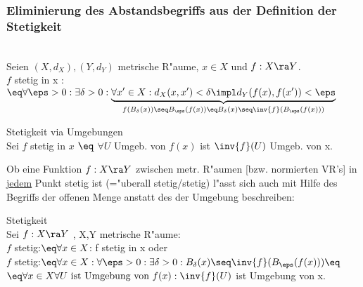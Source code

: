 \subsubsection{Eliminierung des Abstandsbegriffs aus der Definition der Stetigkeit}
\begin{definition}\label{1.8}\\
Seien $(X,d_X),(Y,d_Y)$ metrische R"aume, $x\in X$ und $f:X\ra Y$.\\
$f$ stetig in x :$\eq\forall\eps >0:\exists \delta >0:
\underbrace{\forall x'\in X: d_X(x,x')< \delta\impl d_Y(f(x),f(x')) < \eps }
_{f(B_\delta(x))\seq B_\eps(f(x))\eq B_\delta(x)\seq \inv{f}(B_\eps(f(x)))}$
\end{definition}

\begin{prop}\label{1.9}{Stetigkeit via Umgebungen}\\
Sei $f$ stetig in $x$ $\eq$ $\forall U$ Umgeb. von $f(x)$ ist $\inv{f}(U)$ Umgeb. von x.
\end{prop}
Ob eine Funktion $f:X\ra Y$ zwischen metr. R"aumen [bzw. normierten VR's] in \ul{jedem} Punkt stetig ist (="uberall stetig/stetig) l"asst sich auch mit Hilfe des Begriffs der offenen Menge anstatt des der Umgebung beschreiben:
\begin{definition}\label{1.10}{Stetigkeit}\\
Sei $f:X\ra Y$ , X,Y metrische R"aume:\\
$f$ stetig:$\eq \forall x\in X$: f stetig in x {\small oder}\\
$f$ stetig:$\eq \forall x\in X: \forall \eps >0: \exists\delta >0: B_\delta (x)\seq \inv{f}(B_\eps(f(x)))\eq$\\
$\eq\forall x\in X \forall U \mbox{ ist Umgebung von }f(x):\inv{f}(U)$ ist Umgebung von x.
\end{definition}
